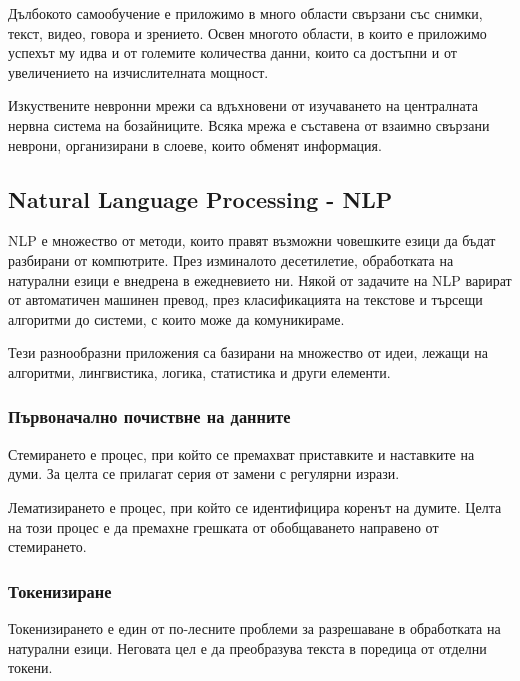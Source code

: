 \documentclass{article}
\newcounter{subsubsubsection}[subsubsection]
\begin{document}
Дълбокото самообучение е приложимо в много области свързани със снимки, текст, видео, говора и зрението. Освен многото
области, в които е приложимо успехът му идва и от големите количества данни, които са достъпни и от увеличението на
изчислителната мощност.

Изкуствените невронни мрежи са вдъхновени от изучаването на централната нервна система на бозайниците. Всяка мрежа е
съставена от взаимно свързани неврони, организирани в слоеве, които обменят информация. \cite{deep-learning-keras}

\subsection{Natural Language Processing - NLP}

NLP е множество от методи, които правят възможни човешките езици да бъдат разбирани от компютрите. През изминалото
десетилетие, обработката на натурални езици е внедрена в ежедневието ни. Някой от задачите на NLP варират от
автоматичен машинен превод, през класификацията на текстове и търсещи алгоритми до системи, с които може да
комуникираме.

Тези разнообразни приложения са базирани на множество от идеи, лежащи на алгоритми, лингвистика, логика, статистика и
други елементи. \cite{intro-to-nlp-mit}

\subsubsection{Първоначално почиствне на данните}


Стемирането е процес, при който се премахват приставките и наставките на думи. За целта се прилагат серия от замени с
регулярни изрази. \cite{intro-to-nlp-mit}


Лематизирането е процес, при който се идентифицира коренът на думите. Целта на този процес е да премахне грешката от
обобщаването направено от стемирането. \cite{intro-to-nlp-mit}

\subsubsection{Токенизиране}

Токенизирането е един от по-лесните проблеми за разрешаване в обработката на натурални езици. Неговата цел е да
преобразува текста в поредица от отделни токени. \cite{intro-to-nlp-mit}
\end{document}
